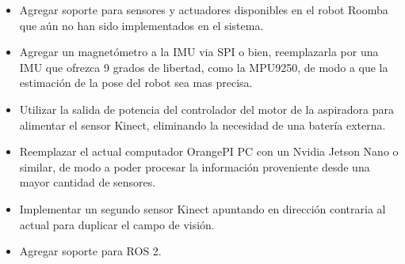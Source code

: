 \begin{itemize}

    \item Agregar soporte para sensores y actuadores disponibles en el robot Roomba que aún no han sido implementados en el sistema.
    \item Agregar un magnetómetro a la IMU via SPI o bien, reemplazarla por una IMU que ofrezca 9 grados de libertad, como la MPU9250, de modo a que la estimación de la pose del robot sea mas precisa.
    \item Utilizar la salida de potencia del controlador del motor de la aspiradora para alimentar el sensor Kinect, eliminando la necesidad de una batería externa.
    \item Reemplazar el actual computador OrangePI PC con un Nvidia Jetson Nano o similar, de modo a poder procesar la información proveniente desde una mayor cantidad de sensores.
    \item Implementar un segundo sensor Kinect apuntando en dirección contraria al actual para duplicar el campo de visión.
    \item Agregar soporte para ROS 2.

\end{itemize}
